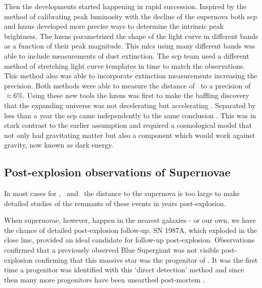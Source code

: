 Then the developments started happening in rapid succession.  Inspired by the method of calibrating peak luminosity with the decline of the supernova both \gls{scp} and \gls{hzsns} developed more precise ways to determine the intrinsic peak brightness. The \gls{hzsns} parametrized the shape of the light curve  in different bands as a function of their peak magnitude. This \gls{mlcs} using many different bands was able to include measurements of dust extinction. The \gls{scp} team used a different method of stretching light curve templates in time to match the observations. This method also was able to incorporate extinction measurements increasing the precision. Both methods were able to measure the distance of \sneia\ to a precision of $\approx6\%$. Using these new tools the \gls{hzsns} was first to make the baffling discovery that the expanding universe was not decelerating but accelerating \citep{1998AJ....116.1009R}. Separated by less than a year the \gls{scp} came independently to the same conclusion \citep{1999ApJ...517..565P}. This was in stark contrast to the earlier assumption and required a cosmological model that not only had gravitating matter but also a component which would work against gravity, now known as dark energy.


\subsection{Post-explosion observations of Supernovae}

In most cases for \sneia, \sneibc\ and \sneii\ the distance to the supernova is too large to make detailed studies of the remnants of these events in years post-explosion.

When supernovae, however, happen in the nearest galaxies - or our own, we have the chance of detailed post-explosion follow-up.
SN 1987A, which exploded in the close \gls{lmc}, provided an ideal candidate for follow-up post-explosion. Observations confirmed that a previously observed Blue Supergiant was not visible post-explosion \citep{1989A&A...219..229W} confirming that this massive star was the progenitor of . It was the first time a progenitor was identified with this `direct detection' method and since then many more progenitors have been unearthed post-mortem \citep[for a review see][]{2009ARA&A..47...63S}.

